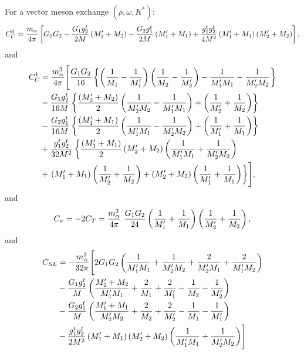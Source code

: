 For a vector meson exchange $(\rho,\omega ,K^*)$:
\begin{equation}
C^0_C = {m_\alpha\over 4\pi} \left[ G_1 G_2 - {G_1 g^t_2\over 2M}
\left( M'_2 + M_2\right) - {G_2 g^t_1\over 2M} \left( M'_1 + M_1\right) +
{g^t_1g^t_2\over 4M^2}
\left( M'_1+M_1\right) \left( M'_2 + M_2\right)\right],
\end{equation}
and
\begin{eqnarray}
C^1_C &= {m^3_\alpha\over 4\pi} \Biggl[ {G_1G_2\over 16} \left\{ \left(
{1\over M_1} - {1\over M'_1}\right) \left( {1\over M_2}-{1\over M'_2}\right) -
{1\over M'_1M_1}-{1\over M'_2M_2}\right\} \\ \nonumber
&- {G_1 g^t_2\over 16M} \left\{ {\left( M'_2+M_2\right)\over 2} \left( {1\over
M'_2 M_2} - {1\over M'_1 M_1}\right) + \left( {1\over M'_2}+{1\over M_2}
\right) \right\} \\ \nonumber
&- {G_2 g^t_1\over 16M} \left\{ {\left( M'_1 + M_1\right)\over 2} \left(
{1\over M'_1M_1} - {1\over M'_2 M_2}\right) + \left( {1\over M'_1} + {1\over
M_1}\right) \right\} \\ \nonumber
&+ {g^t_1g^t_2\over 32M^2} \left\{ {\left( M'_1 + M_1\right)\over 2}
\left(M'_2 + M_2\right) \left(
{1\over M'_1M_1} + {1\over M'_2 M_2}\right) \right. \\ \nonumber
& + \left. \left( M'_1 + M_1\right) \left( {1\over M'_2} + {1\over
M_2}\right) + \left( M'_2 + M_2\right) \left( {1\over M'_1} + {1\over
M_1}\right) \right\} \Biggr],
\end{eqnarray}
and
\begin{equation}
C_\sigma = - 2C_T = {m^3_\alpha\over 4\pi} \  {G_1G_2\over 24} \left( {1\over
M'_1} + {1\over M_1}\right) \left( {1\over M'_2} + {1\over M_2}\right),
\end{equation}
and
\begin{eqnarray}
C_{SL} &= - {m^3_\alpha\over 32\pi} \Biggl[ 2G_1 G_2 \left( {1\over M'_1M_1}
+{1\over M'_2 M_2} + {2\over M'_2 M_1} + {2\over M'_1M_2}\right) \\ \nonumber
&- {G_1 g^t_2\over M} \left( {M'_2 + M_2\over M'_1 M_1} + {2\over M_1} +
{2\over M'_1} - {1\over M_2} - {1\over M'_2}\right) \\ \nonumber
&- {G_2 g^t_1\over M} \left( {M'_1+ M_1\over M'_2 M_2} + {2\over M_2} +
{2\over M'_2} - {1\over M_1} - {1\over M'_1}\right) \\ \nonumber
&- {g^t_1 g^t_2\over 2M^2} \left( M'_1 + M_1\right) \left( M'_2 + M_2\right)
\left( {1\over M'_1M_1} + {1\over M'_2 M_2}\right) \Biggr]
\end{eqnarray}


